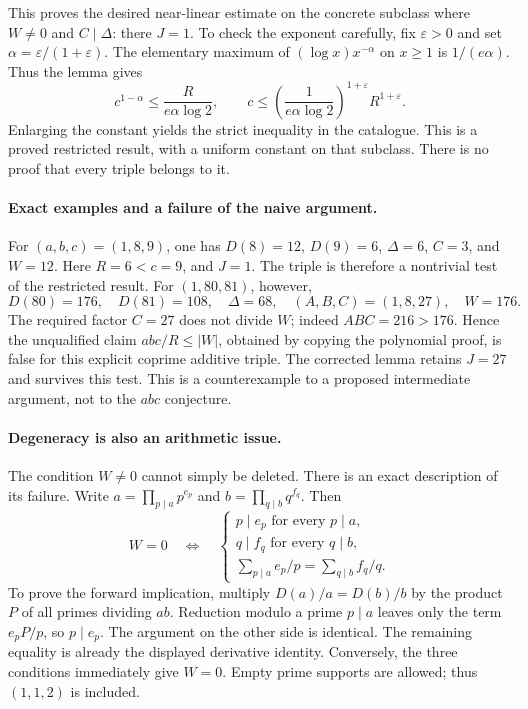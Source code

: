 \documentclass[11pt]{article}
\begin{document}
This proves the desired near-linear estimate on the concrete subclass
where $W\ne0$ and $C\mid\Delta$: there $J=1$.
To check the exponent carefully, fix $\varepsilon>0$ and set
$\alpha=\varepsilon/(1+\varepsilon)$. The elementary maximum of
$(\log x)x^{-\alpha}$ on $x\ge1$ is $1/(e\alpha)$.
Thus the lemma gives
\[
 c^{1-\alpha}\le\frac{R}{e\alpha\log2},\qquad
 c\le\left(\frac1{e\alpha\log2}\right)^{1+\varepsilon}
                      R^{1+\varepsilon}.
\]
Enlarging the constant yields the strict inequality in the catalogue.
This is a proved restricted result, with a uniform constant on that
subclass. There is no proof that every triple belongs to it.

\paragraph{Exact examples and a failure of the naive argument.}
For $(a,b,c)=(1,8,9)$, one has $D(8)=12$, $D(9)=6$,
$\Delta=6$, $C=3$, and $W=12$. Here $R=6<c=9$, and $J=1$.
The triple is therefore a nontrivial test of the restricted result.
For $(1,80,81)$, however,
\[
 D(80)=176,\quad D(81)=108,\quad \Delta=68,
 \quad (A,B,C)=(1,8,27),\quad W=176.
\]
The required factor $C=27$ does not divide $W$; indeed $ABC=216>176$.
Hence the unqualified claim $abc/R\le|W|$, obtained by copying the
polynomial proof, is false for this explicit coprime additive triple.
The corrected lemma retains $J=27$ and survives this test.
This is a counterexample to a proposed intermediate argument, not to
the $abc$ conjecture.

\paragraph{Degeneracy is also an arithmetic issue.}
The condition $W\ne0$ cannot simply be deleted. There is an exact
description of its failure. Write
$a=\prod_{p\mid a}p^{e_p}$ and $b=\prod_{q\mid b}q^{f_q}$.
Then
\begin{equation}\label{ra:11:zero-class}
 W=0\quad\Longleftrightarrow\quad
 \begin{cases}
 p\mid e_p\text{ for every }p\mid a,\\
 q\mid f_q\text{ for every }q\mid b,\\
 \displaystyle\sum_{p\mid a}e_p/p=\sum_{q\mid b}f_q/q.
 \end{cases}
\end{equation}
To prove the forward implication, multiply
$D(a)/a=D(b)/b$ by the product $P$ of all primes dividing $ab$.
Reduction modulo a prime $p\mid a$ leaves only the term
$e_pP/p$, so $p\mid e_p$. The argument on the other side is identical.
The remaining equality is already the displayed derivative identity.
Conversely, the three conditions immediately give $W=0$.
Empty prime supports are allowed; thus $(1,1,2)$ is included.
\end{document}
